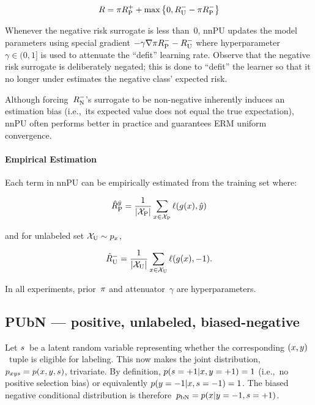 \begin{equation}\label{eq:Risk:nnPU}
  R = \pi R_{\textnormal{P}}^{{+}} + \max\left\{0, R_{\textnormal{U}}^{{-}} - \pi R_{\textnormal{P}}^{{-}} \right\}
\end{equation}

Whenever the negative risk surrogate is less than~0, nnPU updates the model parameters using special gradient ${-\gamma \nabla \pi R_{\textnormal{P}}^{{-}} - R_{\textnormal{U}}^{{-}}}$ where hyperparameter~${\gamma \in (0,1]}$ is used to attenuate the ``defit'' learning rate.  Observe that the negative risk surrogate is deliberately negated; this is done to ``defit'' the learner so that it no longer under estimates the negative class' expected risk.

Although forcing~$R_{\textnormal{N}}^{{-}}$'s surrogate to be non-negative inherently induces an estimation bias (i.e.,~its expected value does not equal the true expectation), nnPU often performs better in practice and guarantees ERM uniform convergence.

\paragraph{Empirical Estimation} Each term in nnPU can be empirically estimated from the training set where:

\begin{equation}\label{eq:EmpRisk:Pos}
  \hat{R}_{\textnormal{P}}^{\hat{y}} = \frac{1}{\lvert\mathcal{X}_{\textnormal{P}}\rvert} \sum_{x \in \mathcal{X}_{\textnormal{P}}} \ell\mathopen{}\left(g\mathopen{}\left(x\right)\mathclose{},\hat{y}\right)\mathclose{}
\end{equation}

\noindent
and for unlabeled set ${\mathcal{X}_{\textnormal{U}} \sim p_{x}}$,

\begin{equation}
  \hat{R}_{\textnormal{U}}^{-} = \frac{1}{\lvert\mathcal{X}_{\textnormal{U}}\rvert} \sum_{x \in \mathcal{X}_{\textnormal{U}}} \ell\mathopen{}\left(g\mathopen{}\left(x\right)\mathclose{},{-}1\right)\mathclose{} \text{.}
\end{equation}

\noindent
In all experiments, prior~$\pi$ and attenuator~$\gamma$ are hyperparameters.

\subsection{PUbN --- positive, unlabeled, biased-negative}

Let $s$~be a latent random variable representing whether the corresponding ${(x,y)}$~tuple is eligible for labeling.  This now makes the joint distribution,~${p_{xys} = p(x, y, s)}$, trivariate.  By definition, ${p(s = {+}1 \vert x, y = {+}1) = 1}$ (i.e.,~no positive selection bias) or equivalently ${p(y = {-}1 \vert x, s = {-}1) = 1}$.  The biased negative conditional distribution is therefore~${p_{\textnormal{bN}} = p(x \vert y = {-}1, s = {+}1)}$.

